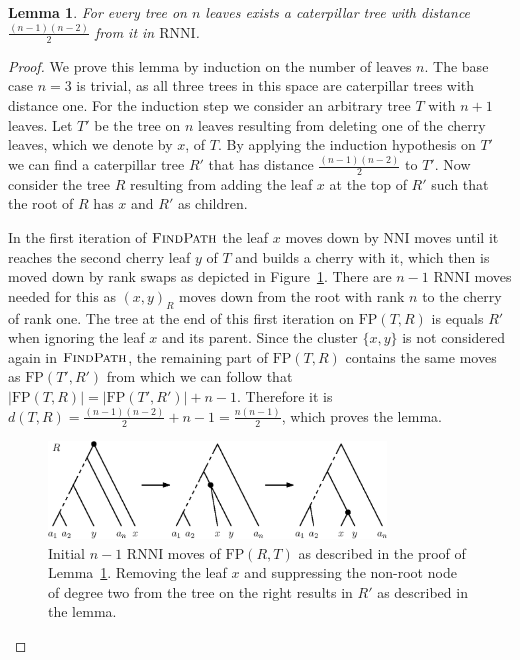 \documentclass[11pt]{amsart}
\newtheorem{lemma}{Lemma}
\newcommand{\rnni}{\mathrm{RNNI}}
\newcommand{\findpath}{\textsc{FindPath}}
\newcommand{\nni}{\mathrm{NNI}}
\newcommand{\fp}{\mathrm{FP}}
\begin{document}
\begin{lemma}
	For every tree on $n$ leaves exists a caterpillar tree with distance $\frac{(n-1)(n-2)}{2}$ from it in $\rnni$.
	\label{lemma:max_dist_ctree}
\end{lemma}

\begin{proof}
	We prove this lemma by induction on the number of leaves $n$.
	The base case $n=3$ is trivial, as all three trees in this space are caterpillar trees with distance one.
	For the induction step we consider an arbitrary tree $T$ with $n + 1$ leaves.
	Let $T'$ be the tree on $n$ leaves resulting from deleting one of the cherry leaves, which we denote by $x$, of $T$.
	By applying the induction hypothesis on $T'$ we can find a caterpillar tree $R'$ that has distance $\frac{(n-1)(n-2)}{2}$ to $T'$.
	Now consider the tree $R$ resulting from adding the leaf $x$ at the top of $R'$ such that the root of $R$ has $x$ and $R'$ as children.

	In the first iteration of $\findpath$ the leaf $x$ moves down by $\nni$ moves until it reaches the second cherry leaf $y$ of $T$ and builds a cherry with it, which then is moved down by rank swaps as depicted in Figure~\ref{fig:max_dist_ctree}.
	There are $n-1$ $\rnni$ moves needed for this as $(x,y)_R$ moves down from the root with rank $n$ to the cherry of rank one.
	The tree at the end of this first iteration on $\fp(T,R)$ is equals $R'$ when ignoring the leaf $x$ and its parent.
	Since the cluster $\{x,y\}$ is not considered again in $\findpath$, the remaining part of $\fp(T,R)$ contains the same moves as $\fp(T',R')$ from which we can follow that $|\fp(T,R)| = |\fp(T',R')| + n-1$.
	Therefore it is $d(T,R) = \frac{(n-1)(n-2)}{2} + n-1 = \frac{n(n-1)}{2}$, which proves the lemma.
	\begin{figure}[ht]
		\includegraphics[width=0.8\textwidth]{max_dist_ctree.eps}
		\caption{Initial $n - 1$ $\rnni$ moves of $\fp(R,T)$ as described in the proof of Lemma~\ref{lemma:max_dist_ctree}.
		Removing the leaf $x$ and suppressing the non-root node of degree two from the tree on the right results in $R'$ as described in the lemma.}
		\label{fig:max_dist_ctree}
	\end{figure}
\end{proof}
\end{document}

